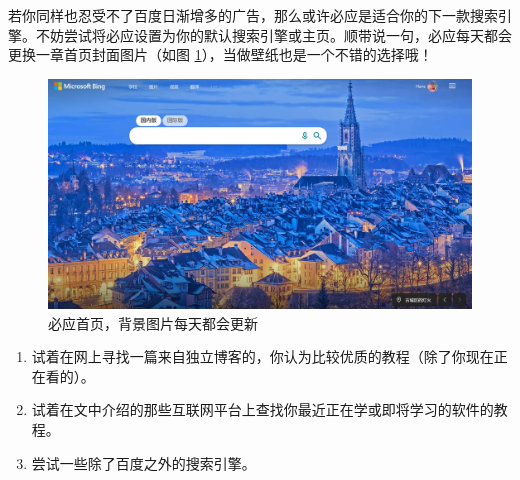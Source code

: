 若你同样也忍受不了百度日渐增多的广告，那么或许必应是适合你的下一款搜索引擎。不妨尝试将必应设置为你的默认搜索引擎或主页。顺带说一句，必应每天都会更换一章首页封面图片（如图 \ref{Bing_2}），当做壁纸也是一个不错的选择哦！

\begin{figure}[htb!]
  \centering
  \includegraphics[width=12cm]{assets/Bing_2.jpg}
  \caption{必应首页，背景图片每天都会更新}
  \label{Bing_2}
\end{figure}

\practice

\begin{enumerate}
  \item 试着在网上寻找一篇来自独立博客的，你认为比较优质的教程（除了你现在正在看的）。
  \item 试着在文中介绍的那些互联网平台上查找你最近正在学或即将学习的软件的教程。
  \item 尝试一些除了百度之外的搜索引擎。
\end{enumerate}
